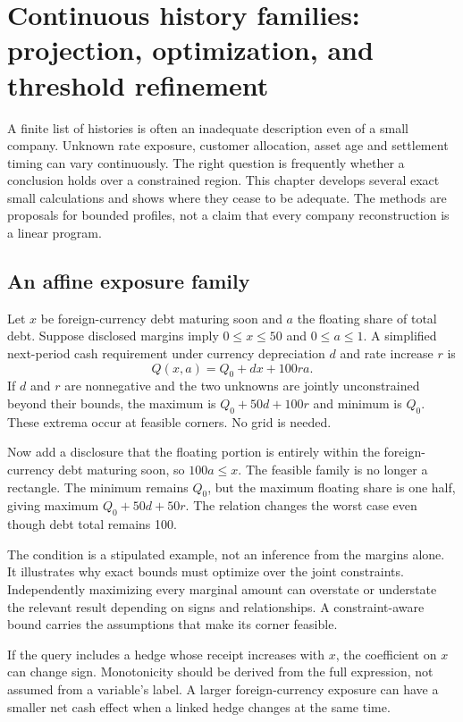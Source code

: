 \chapter[Continuous families and exact bounds]{Continuous history families: projection, optimization, and threshold refinement}
\label{sim:continuous-methods}

A finite list of histories is often an inadequate description even of a small company. Unknown rate exposure, customer allocation, asset age and settlement timing can vary continuously. The right question is frequently whether a conclusion holds over a constrained region. This chapter develops several exact small calculations and shows where they cease to be adequate. The methods are proposals for bounded profiles, not a claim that every company reconstruction is a linear program.

\section{An affine exposure family}
Let $x$ be foreign-currency debt maturing soon and $a$ the floating share of total debt. Suppose disclosed margins imply $0\leq x\leq50$ and $0\leq a\leq1$. A simplified next-period cash requirement under currency depreciation $d$ and rate increase $r$ is
\begin{equation}
 Q(x,a)=Q_0+dx+100ra.
\end{equation}
If $d$ and $r$ are nonnegative and the two unknowns are jointly unconstrained beyond their bounds, the maximum is $Q_0+50d+100r$ and minimum is $Q_0$. These extrema occur at feasible corners. No grid is needed.

Now add a disclosure that the floating portion is entirely within the foreign-currency debt maturing soon, so $100a\leq x$. The feasible family is no longer a rectangle. The minimum remains $Q_0$, but the maximum floating share is one half, giving maximum $Q_0+50d+50r$. The relation changes the worst case even though debt total remains 100.

The condition is a stipulated example, not an inference from the margins alone. It illustrates why exact bounds must optimize over the joint constraints. Independently maximizing every marginal amount can overstate or understate the relevant result depending on signs and relationships. A constraint-aware bound carries the assumptions that make its corner feasible.

If the query includes a hedge whose receipt increases with $x$, the coefficient on $x$ can change sign. Monotonicity should be derived from the full expression, not assumed from a variable's label. A larger foreign-currency exposure can have a smaller net cash effect when a linked hedge changes at the same time.


